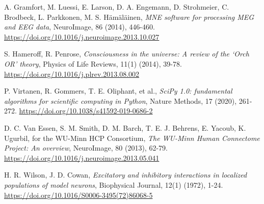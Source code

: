 \documentclass[12pt, reqno]{amsart}
\theoremstyle{definition}
\theoremstyle{remark}
\numberwithin{equation}{section}
\begin{document}

\begin{thebibliography}{99}

 A. Gramfort, M. Luessi, E. Larson, D. A. Engemann, D. Strohmeier, C. Brodbeck, L. Parkkonen, M. S. Hämäläinen, \textit{MNE software for processing MEG and EEG data}, NeuroImage, 86 (2014), 446-460.
\url{https://doi.org/10.1016/j.neuroimage.2013.10.027}

 S. Hameroff, R. Penrose, \textit{Consciousness in the universe: A review of the ‘Orch OR’ theory}, Physics of Life Reviews, 11(1) (2014), 39-78.
\url{https://doi.org/10.1016/j.plrev.2013.08.002}

 P. Virtanen, R. Gommers, T. E. Oliphant, et al., \textit{SciPy 1.0: fundamental algorithms for scientific computing in Python}, Nature Methods, 17 (2020), 261-272.
\url{https://doi.org/10.1038/s41592-019-0686-2}

 D. C. Van Essen, S. M. Smith, D. M. Barch, T. E. J. Behrens, E. Yacoub, K. Ugurbil, for the WU-Minn HCP Consortium, \textit{The WU-Minn Human Connectome Project: An overview}, NeuroImage, 80 (2013), 62-79.
\url{https://doi.org/10.1016/j.neuroimage.2013.05.041}

 H. R. Wilson, J. D. Cowan, \textit{Excitatory and inhibitory interactions in localized populations of model neurons}, Biophysical Journal, 12(1) (1972), 1-24.
\url{https://doi.org/10.1016/S0006-3495(72)86068-5}

\end{thebibliography}
\end{document}
